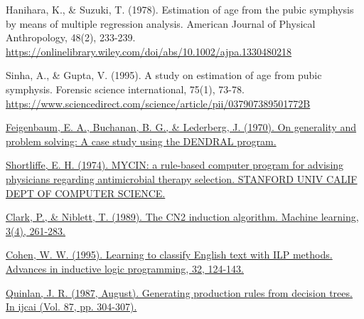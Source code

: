 \begin{thebibliography}{9}

	Hanihara, K., \& Suzuki, T. (1978). Estimation of age from the pubic symphysis by means of multiple regression analysis. American Journal of Physical Anthropology, 48(2), 233-239. \url{https://onlinelibrary.wiley.com/doi/abs/10.1002/ajpa.1330480218}


	Sinha, A., \& Gupta, V. (1995). A study on estimation of age from pubic symphysis. Forensic science international, 75(1), 73-78. \url{https://www.sciencedirect.com/science/article/pii/037907389501772B}



	\href{https://www.researchgate.net/profile/Bruce-Buchanan/publication/23865744_On_generality_and_problem_solving_A_case_study_using_the_DENDRAL_program/links/0c96052e1e6f7e6a57000000/On-generality-and-problem-solving-A-case-study-using-the-DENDRAL-program.pdf}{Feigenbaum, E. A., Buchanan, B. G., \& Lederberg, J. (1970). On generality and problem solving: A case study using the DENDRAL program.}


	\href{https://apps.dtic.mil/sti/citations/ADA001373}{Shortliffe, E. H. (1974). MYCIN: a rule-based computer program for advising physicians regarding antimicrobial therapy selection. STANFORD UNIV CALIF DEPT OF COMPUTER SCIENCE.}


	\href{https://link.springer.com/article/10.1023/A:1022641700528}{Clark, P., \& Niblett, T. (1989). The CN2 induction algorithm. Machine learning, 3(4), 261-283.}


	\href{https://citeseerx.ist.psu.edu/viewdoc/download?doi=10.1.1.14.4483&rep=rep1&type=pdf}{Cohen, W. W. (1995). Learning to classify English text with ILP methods. Advances in inductive logic programming, 32, 124-143.}


	\href{https://citeseerx.ist.psu.edu/viewdoc/download?doi=10.1.1.98.9054&rep=rep1&type=pdf}{Quinlan, J. R. (1987, August). Generating production rules from decision trees. In ijcai (Vol. 87, pp. 304-307).}


\end{thebibliography}
